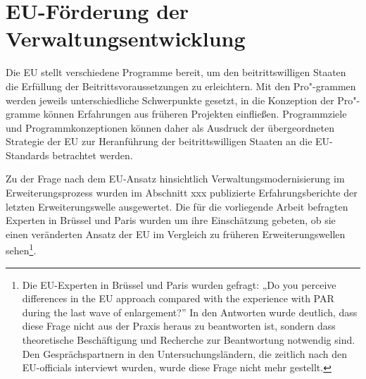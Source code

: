 \section{EU-Förderung der Verwaltungsentwicklung }
Die EU stellt verschiedene Programme bereit, um den beitrittswilligen Staaten die Erfüllung der Beitrittsvoraussetzungen zu erleichtern. Mit den Pro"-grammen werden jeweils unterschiedliche Schwerpunkte gesetzt, in die Konzeption der Pro"-gramme können Erfahrungen aus früheren Projekten einfließen. Programmziele und Programmkonzeptionen können daher als Ausdruck der übergeordneten Strategie der EU zur Heranführung der beitrittswilligen Staaten an die EU-Standards betrachtet werden.\par
Zu der Frage nach dem EU-Ansatz hinsichtlich Verwaltungsmodernisierung im Erweiterungsprozess wurden im Abschnitt xxx publizierte Erfahrungsberichte der letzten Erweiterungswelle ausgewertet. Die für die vorliegende Arbeit befragten Experten in Brüssel und Paris wurden um ihre Einschätzung gebeten, ob sie einen veränderten Ansatz der EU im Vergleich zu früheren Erweiterungswellen sehen\footnote{Die EU-Experten in Brüssel und Paris wurden gefragt: „Do you perceive differences in the EU approach compared with the experience with PAR during the last wave of enlargement?” In den Antworten wurde deutlich, dass diese Frage nicht aus der Praxis heraus zu beantworten ist, sondern dass theoretische Beschäftigung und Recherche zur Beantwortung notwendig sind. Den Gesprächspartnern in den Untersuchungsländern, die zeitlich nach den EU-officials interviewt wurden, wurde diese Frage nicht mehr gestellt.}.

